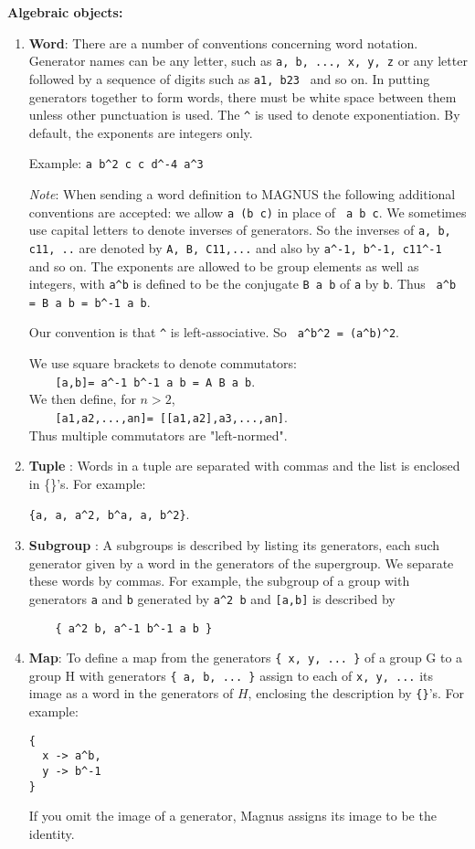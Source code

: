 \documentclass[12pt]{article}
\def\magnus{MAGNUS }
\begin{document}
\textbf{ Algebraic objects:}
\begin{enumerate}
\item \textbf{Word}:
There are a number of conventions concerning word notation.
Generator names can be any letter, such as 
\verb+a, b, ..., x, y, z+
or any letter followed by a sequence of digits such as 
\verb+a1, b23 +
and so on. In putting generators together to form words, there
must be white space between them unless other punctuation is
used. The \verb+^+ is used to denote exponentiation. By default, the
exponents are integers only.

Example: \verb+a b^2 c c d^-4 a^3+

{\em Note}: When sending a word definition to \magnus the
following additional conventions are accepted: we allow \verb+a (b c)+
in place of \verb+ a b c+. We sometimes use capital letters to denote
inverses of generators. So the inverses of \verb+a, b, c11, ..+ are
denoted by \verb+A, B, C11,...+ and also by \verb+a^-1, b^-1, c11^-1 +and so
on.  The exponents are allowed to be group elements as well as
integers, with \verb+a^b+ is defined to be the conjugate \verb+B a b+ of 
\verb+a+ by \verb+b+.
Thus \verb+ a^b = B a b = b^-1 a b+.

Our convention is that \verb+^+ is left-associative. So 
\verb+ a^b^2 = (a^b)^2+.

We use square brackets to denote commutators:\\ 
\verb+    [a,b]= a^-1 b^-1 a b = A B a b+.\\
We then define, for $n > 2$, \\
\verb+    [a1,a2,...,an]= [[a1,a2],a3,...,an]+.\\
Thus multiple commutators are "left-normed".

\item \textbf{Tuple} :
Words in a tuple are separated  with
commas and the list is enclosed in \{\}'s. For
example:

\verb+{a, a, a^2, b^a, a, b^2}+.


\item \textbf{Subgroup} : 
A subgroups is described by listing its generators, each such
generator given by a word in the generators of the supergroup. We
separate these words by commas. For example, the subgroup of a
group with generators \verb+a+ and \verb+b+ generated 
by \verb+a^2 b+ and \verb+[a,b]+ is
described by

\verb+    { a^2 b, a^-1 b^-1 a b }+


\item \textbf{ Map}:
To define a map from the generators
\verb+{ x, y, ... }+
of a group G to a group H with generators
\verb+{ a, b, ... }+
assign to each of \verb+x, y, ...+ its image as a word in the generators
of $H$, enclosing the description by \verb+{}+'s. For example:
\begin{verbatim}
{
  x -> a^b,
  y -> b^-1
}
\end{verbatim}
If you omit the image of a generator, Magnus assigns its image to
be the identity.


\end{enumerate}
\end{document}
